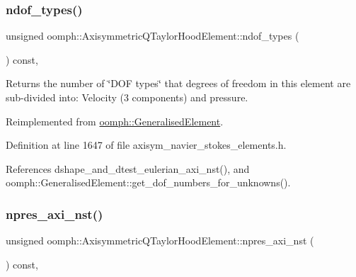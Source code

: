 \subsubsection{\texorpdfstring{ndof\+\_\+types()}{ndof\_types()}}
{\footnotesize\ttfamily unsigned oomph\+::\+Axisymmetric\+Q\+Taylor\+Hood\+Element\+::ndof\+\_\+types (\begin{DoxyParamCaption}{ }\end{DoxyParamCaption}) const\hspace{0.3cm}{\ttfamily [inline]}, {\ttfamily [virtual]}}



Returns the number of \char`\"{}\+D\+O\+F types\char`\"{} that degrees of freedom in this element are sub-\/divided into\+: Velocity (3 components) and pressure. 



Reimplemented from \hyperlink{classoomph_1_1GeneralisedElement_a0c6037a870597b35dcf1c780710b9a56}{oomph\+::\+Generalised\+Element}.



Definition at line 1647 of file axisym\+\_\+navier\+\_\+stokes\+\_\+elements.\+h.



References dshape\+\_\+and\+\_\+dtest\+\_\+eulerian\+\_\+axi\+\_\+nst(), and oomph\+::\+Generalised\+Element\+::get\+\_\+dof\+\_\+numbers\+\_\+for\+\_\+unknowns().

\mbox{\label{classoomph_1_1AxisymmetricQTaylorHoodElement_a636d0c75c75483f9da193d0192f4e05e}} 
\subsubsection{\texorpdfstring{npres\+\_\+axi\+\_\+nst()}{npres\_axi\_nst()}}
{\footnotesize\ttfamily unsigned oomph\+::\+Axisymmetric\+Q\+Taylor\+Hood\+Element\+::npres\+\_\+axi\+\_\+nst (\begin{DoxyParamCaption}{ }\end{DoxyParamCaption}) const\hspace{0.3cm}{\ttfamily [inline]}, {\ttfamily [virtual]}}



